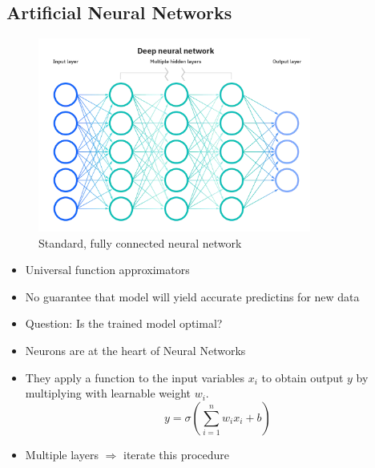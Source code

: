 \subsection{Artificial Neural Networks}
\label{subsec:ml-techniques-deep-learning}
\begin{frame}{\insertsubsection}
    \begin{figure}
        \centering
        \includegraphics[width=0.8\textwidth]{media/ICLH_Diagram_Batch_01_03-DeepNeuralNetwork-WHITEBG.png}
        \caption{Standard, fully connected neural network~\cite{IBM2020}}
    \end{figure}
\end{frame}
%
%
\begin{frame}{\insertsubsection}
    \begin{itemize}
        \item Universal function approximators
        \item No guarantee that model will yield accurate predictins for new data
        \item Question: Is the trained model optimal?
        \item Neurons are at the heart of Neural Networks
        \item[] They apply a function to the input variables $x_i$ to obtain output $y$ by multiplying with learnable weight $w_i$.
        \begin{equation}
            y = \sigma\left(\sum\limits_{i=1}^n w_ix_i + b\right)
        \end{equation}
        \item Multiple layers $\Rightarrow$ iterate this procedure
    \end{itemize}
\end{frame}
%
%
